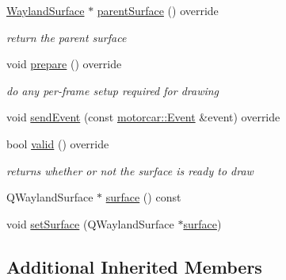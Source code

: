 \begin{DoxyCompactItemize}
\hyperlink{classmotorcar_1_1WaylandSurface_a12a62c259b5041c6780c703ec2f12f01}{Wayland\-Surface} $\ast$ \hyperlink{classqtmotorcar_1_1QtWaylandMotorcarSurface_a3b0aed06d7ed9287497bc342f9fc787b}{parent\-Surface} () override
\begin{DoxyCompactList}\small\item\em return the parent surface \end{DoxyCompactList}\item 
void \hyperlink{classqtmotorcar_1_1QtWaylandMotorcarSurface_ae898706dcf80a2f00ed2477c570dcebe}{prepare} () override
\begin{DoxyCompactList}\small\item\em do any per-\/frame setup required for drawing \end{DoxyCompactList}\item 
void \hyperlink{classqtmotorcar_1_1QtWaylandMotorcarSurface_a7deebcf58954f82c8d5741af054414a7}{send\-Event} (const \hyperlink{classmotorcar_1_1Event}{motorcar\-::\-Event} \&event) override
\item 
bool \hyperlink{classqtmotorcar_1_1QtWaylandMotorcarSurface_a3bea85a2a6a3079e60c3b37dd08aebc6}{valid} () override
\begin{DoxyCompactList}\small\item\em returns whether or not the surface is ready to draw \end{DoxyCompactList}\item 
Q\-Wayland\-Surface $\ast$ \hyperlink{classqtmotorcar_1_1QtWaylandMotorcarSurface_aeac2b36246941755d0bedaf1c9fe773b}{surface} () const 
\item 
void \hyperlink{classqtmotorcar_1_1QtWaylandMotorcarSurface_aa7921de176d4d39fe076f145dd382e75}{set\-Surface} (Q\-Wayland\-Surface $\ast$\hyperlink{simple-egl_8cpp_a0720952aa1caded45b5bcdce589663a9}{surface})
\end{DoxyCompactItemize}
\subsection*{Additional Inherited Members}



